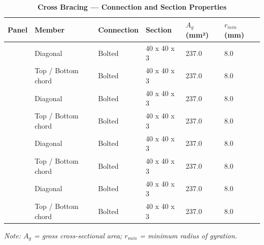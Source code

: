 \documentclass[12pt,a4paper]{report}
\numberwithin{table}{chapter}
\numberwithin{figure}{chapter}
\begin{document}
\vspace{1em}

\vspace{0.4em}
\noindent
\setlength{\tabcolsep}{4pt}
\setlength\LTleft{0pt}
\setlength\LTright{\fill}

\begin{longtable}{|C{2.0cm}|L{2.0cm}|L{2.2cm}|C{2.5cm}|C{2.0cm}|C{2.0cm}|}
\caption{\textbf{Cross Bracing --- Connection and Section Properties}}
\hline
\textbf{Panel} & \textbf{Member} & \textbf{Connection} & \textbf{Section} & \textbf{$A_g$ (mm²)} & \textbf{$r_{min}$ (mm)} \\[6pt]
\hline
{} & Diagonal & Bolted & 40 x 40 x 3 & 237.0 & 8.0 \\[6pt]
 & Top / Bottom chord & Bolted & 40 x 40 x 3 & 237.0 & 8.0 \\[6pt]
\hline
{} & Diagonal & Bolted & 40 x 40 x 3 & 237.0 & 8.0 \\[6pt]
 & Top / Bottom chord & Bolted & 40 x 40 x 3 & 237.0 & 8.0 \\[6pt]
\hline
{} & Diagonal & Bolted & 40 x 40 x 3 & 237.0 & 8.0 \\[6pt]
 & Top / Bottom chord & Bolted & 40 x 40 x 3 & 237.0 & 8.0 \\[6pt]
\hline
{} & Diagonal & Bolted & 40 x 40 x 3 & 237.0 & 8.0 \\[6pt]
 & Top / Bottom chord & Bolted & 40 x 40 x 3 & 237.0 & 8.0 \\[6pt]
\hline
\end{longtable}
\noindent\textit{Note: $A_g$ = gross cross-sectional area; $r_{min}$ = minimum radius of gyration.}
\end{document}
